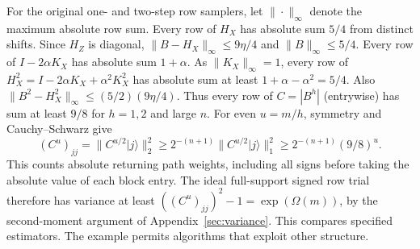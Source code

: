 \documentclass[11pt]{article}
\newcommand{\ket}[1]{\lvert #1\rangle}
\begin{document}
For the original one- and two-step row samplers, let \(\|\cdot\|_\infty\) denote the maximum absolute row sum. Every row of \(H_X\) has absolute sum \(5/4\) from distinct shifts. Since \(H_Z\) is diagonal, \(\|B-H_X\|_\infty\le9\eta/4\) and \(\|B\|_\infty\le5/4\). Every row of \(I-2\alpha K_X\) has absolute sum \(1+\alpha\). As \(\|K_X\|_\infty=1\), every row of \(H_X^2=I-2\alpha K_X+\alpha^2K_X^2\) has absolute sum at least \(1+\alpha-\alpha^2=5/4\). Also \(\|B^2-H_X^2\|_\infty\le(5/2)(9\eta/4)\). Thus every row of \(C=|B^h|\) (entrywise) has sum at least \(9/8\) for \(h=1,2\) and large \(n\). For even \(u=m/h\), symmetry and Cauchy--Schwarz give
\[
 (C^u)_{jj}=\|C^{u/2}\ket j\|_2^2
 \ge 2^{-(n+1)}\|C^{u/2}\ket j\|_1^2
 \ge 2^{-(n+1)}(9/8)^u .
\]
This counts absolute returning path weights, including all signs before taking the absolute value of each block entry. The ideal full-support signed row trial therefore has variance at least \(((C^u)_{jj})^2-1=\exp(\Omega(m))\), by the second-moment argument of Appendix~\ref{sec:variance}. This compares specified estimators. The example permits algorithms that exploit other structure.
\end{document}
